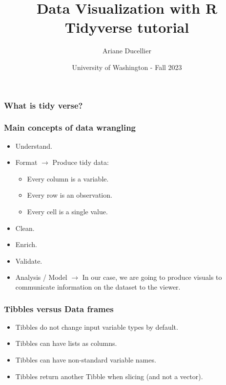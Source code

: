 \documentclass{beamer}
\title[Data Visualization with R - Tidyverse tutorial]{Data Visualization with R \\ Tidyverse tutorial}
\author{Ariane Ducellier}
\date{University of Washington - Fall 2023}
\begin{document}
	\begin{frame}
		\titlepage
	\end{frame}

	\begin{frame}
		\frametitle{What is tidy verse?}
		
	\end{frame}

	\begin{frame}
		\frametitle{Main concepts of data wrangling}

		\begin{itemize}
		\setlength{\itemsep}{1em}
			\item Understand.
			\item Format $\rightarrow$ Produce tidy data:
			\begin{itemize}
				\item Every column is a variable.
				\item Every row is an observation.
				\item Every cell is a single value.
			\end{itemize}
			\item Clean.
			\item Enrich.
			\item Validate.
			\item Analysis / Model $\rightarrow$ In our case, we are going to produce visuals to communicate information on the dataset to the viewer.
		\end{itemize}

	\end{frame}

	\begin{frame}
		\frametitle{Tibbles versus Data frames}

		\begin{itemize}
		\setlength{\itemsep}{1em}
			\item Tibbles do not change input variable types by default.
			\item Tibbles can have lists as columns.
			\item Tibbles can have non-standard variable names.
			\item Tibbles return another Tibble when slicing (and not a vector).
		\end{itemize}

	\end{frame}
\end{document}
